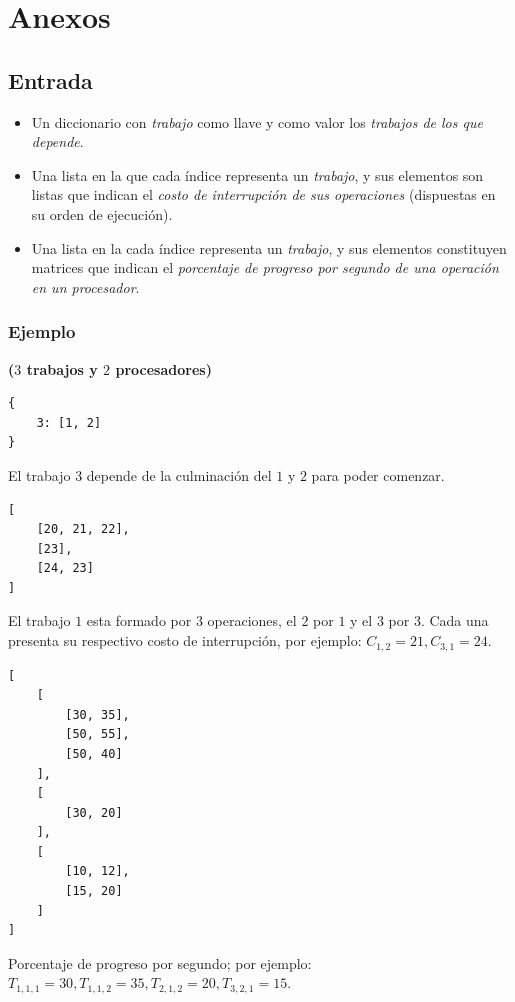 \documentclass[14pt]{extarticle}
\begin{document}
\section*{Anexos}

\subsection*{Entrada}

\begin{itemize}
    \item Un diccionario con \textit{trabajo} como llave y como valor los \textit{trabajos de los que depende}.
    \item Una lista en la que cada índice representa un \textit{trabajo}, y sus elementos son listas que indican el \textit{costo de interrupción de sus operaciones} (dispuestas en su orden de ejecución).
    \item Una lista en la cada índice representa un \textit{trabajo}, y sus elementos constituyen matrices que indican el \textit{porcentaje de progreso por segundo de una operación en un procesador}.
\end{itemize}

\subsubsection*{Ejemplo}

\textbf{($3$ trabajos y $2$ procesadores)}

\begin{verbatim}
{
    3: [1, 2]
}
\end{verbatim}

El trabajo $3$ depende de la culminación del $1$ y $2$ para poder comenzar.

\begin{verbatim}
[
    [20, 21, 22],
    [23],
    [24, 23]
]
\end{verbatim}

El trabajo $1$ esta formado por $3$ operaciones, el $2$ por $1$ y el $3$ por $3$. Cada una presenta su respectivo costo de interrupción, por ejemplo: $C_{1, 2} = 21, C_{3, 1} = 24$.

\begin{verbatim}
[
    [
        [30, 35],
        [50, 55],
        [50, 40]
    ],
    [
        [30, 20]
    ],
    [
        [10, 12],
        [15, 20]
    ]
]
\end{verbatim}

Porcentaje de progreso por segundo; por ejemplo: $T_{1, 1, 1} = 30, T_{1, 1, 2} = 35, T_{2, 1, 2} = 20, T_{3, 2, 1} = 15$.
\end{document}
